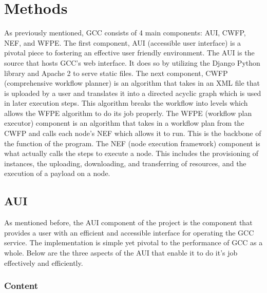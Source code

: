 \documentclass[fleqn,10pt]{SelfArx} %
\begin{document}

\section{Methods}
\label{sec:methods}

As previously mentioned, GCC consists of 4 main components: AUI, CWFP, NEF, and WFPE. The first component, AUI (accessible user interface) is a pivotal piece to fostering an effective user friendly environment. The AUI is the source that hosts GCC's web interface. It does so by utilizing the Django Python library and Apache 2 to serve static files. The next component, CWFP (comprehensive workflow planner) is an algorithm that takes in an XML file that is uploaded by a user and translates it into a directed acyclic graph which is used in later execution steps. This algorithm breaks the workflow into levels which allows the WFPE algorithm to do its job properly. The WFPE (workflow plan executor) component is an algorithm that takes in a workflow plan from the CWFP and calls each node's NEF which allows it to run. This is the backbone of the function of the program. The NEF (node execution framework) component is what actually calls the steps to execute a node. This includes the provisioning of instances, the uploading, downloading, and transferring of resources, and the execution of a payload on a node.

\subsection{AUI}

As mentioned before, the AUI component of the project is the component that provides a user with an efficient and accessible interface for operating the GCC service. The implementation is simple yet pivotal to the performance of GCC as a whole. Below are the three aspects of the AUI that enable it to do it's job effectively and efficiently.

\subsubsection{Content}
\end{document}
